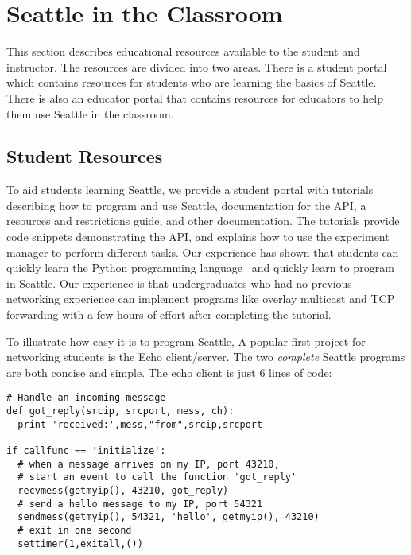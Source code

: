 \section{Seattle in the Classroom}
\label{sec-assignments}

This section describes educational resources available to the student and 
instructor.   The resources are divided into two areas.   There is a student
portal which contains resources for students who are learning the basics of
Seattle.   There is also an educator portal that contains resources for 
educators to help them use Seattle in the classroom.   

\subsection{Student Resources}
To aid students learning Seattle, we provide a student portal with
tutorials describing how to program and use Seattle, documentation for the API,
a resources and restrictions guide, and other documentation.   The tutorials 
provide code snippets demonstrating the API, and explains how to use the 
experiment manager to perform different tasks.
Our experience has shown that students can quickly learn the Python
programming language~\cite{611980, Cappos_WORLDS_2005} and quickly learn
to program in Seattle.   Our experience is that undergraduates who had no 
previous networking experience can implement programs like overlay 
multicast and TCP forwarding with a few hours of effort after completing 
the tutorial.

To illustrate how easy it is to program Seattle, 
A popular first project for networking students is the Echo
client/server. The two \emph{complete} Seattle programs are both
concise and simple. The echo client is just 6 lines of code:

{\scriptsize
\begin{verbatim}
# Handle an incoming message
def got_reply(srcip, srcport, mess, ch):
  print 'received:',mess,"from",srcip,srcport

if callfunc == 'initialize':
  # when a message arrives on my IP, port 43210, 
  # start an event to call the function 'got_reply'
  recvmess(getmyip(), 43210, got_reply)  
  # send a hello message to my IP, port 54321
  sendmess(getmyip(), 54321, 'hello', getmyip(), 43210)  
  # exit in one second
  settimer(1,exitall,())
\end{verbatim}
}

